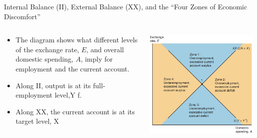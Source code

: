\documentclass[10pt,hyperref={CJKbookmarks=true},xcolor=dvipsnames,aspectratio=169]{beamer}
\begin{document}
\begin{frame}{Internal Balance (II),
	External Balance (XX),
	and the “Four Zones of
	Economic Discomfort”}

\begin{columns}[onlytextwidth]
	\begin{column}{0.5\textwidth}
		\begin{itemize}			
		\item The diagram shows what	different levels of the exchange
		rate, $E$, and overall domestic	spending, $A$, imply for
		employment and the current
		account. 
		\item Along II, output is at its
		full-employment level,Y f. 
		\item Along	XX, the current account is at its
		target level, X
		\end{itemize}
	\end{column}
	\begin{column}{0.5\textwidth}
		\centering
		\includegraphics[scale=0.45]{fig/systems/balance}
	\end{column}
\end{columns}
\end{frame}
\end{document}
